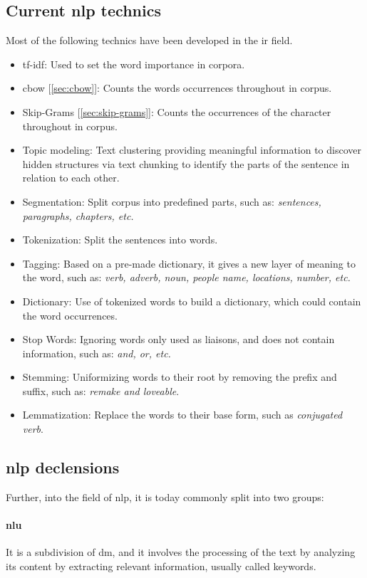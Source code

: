 \subsection{Current \gls{nlp} technics}
Most of the following technics have been developed in the \gls{ir} field.

\begin{itemize}
    \setlength\itemsep{0em}
    \item \gls{tf-idf}: Used to set the word importance in corpora.
    \item \gls{cbow} [\ref{sec:cbow}]: Counts the words occurrences throughout in corpus.
    \item Skip-Grams [\ref{sec:skip-grams}]: Counts the occurrences of the character throughout in corpus.
    \item Topic modeling: Text clustering providing meaningful information to discover hidden structures via text chunking to identify the parts of the sentence in relation to each other.
    \item Segmentation: Split corpus into predefined parts, such as: \textit{sentences, paragraphs, chapters, etc.}
    \item Tokenization: Split the sentences into words.
    \item Tagging: Based on a pre-made dictionary, it gives a new layer of meaning to the word, such as: \textit{verb, adverb, noun, people name, locations, number, etc.}
    \item Dictionary: Use of tokenized words to build a dictionary, which could contain the word occurrences.
    \item Stop Words: Ignoring words only used as liaisons, and does not contain information, such as: \textit{and, or, etc.}
    \item Stemming: Uniformizing words to their root by removing the prefix and suffix, such as: \textit{remake and loveable}.
    \item Lemmatization: Replace the words to their base form, such as \textit{conjugated verb}.
\end{itemize}

\subsection{\gls{nlp} declensions}
Further, into the field of \gls{nlp}, it is today commonly split into two groups:

\paragraph{\gls{nlu}}
It is a subdivision of \gls{dm}, and it involves the processing of the text by analyzing its content by extracting relevant information, usually called keywords.

